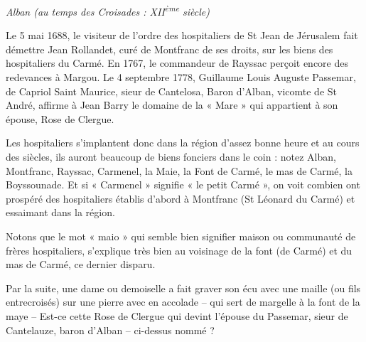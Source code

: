 \begin{center}
  {\Large\itshape Alban (au temps des Croisades : XII\textsuperscript{ème} siècle)}
\end{center}

\vspace{1em}

Le 5 mai 1688, le visiteur de l'ordre des hospitaliers de St Jean de Jérusalem fait démettre Jean Rollandet, curé de Montfranc de ses droits, sur les biens des hospitaliers du Carmé. En 1767, le commandeur de Rayssac perçoit encore des redevances à Margou. Le 4 septembre 1778, Guillaume Louis Auguste Passemar, de Capriol Saint Maurice, sieur de Cantelosa, Baron d'Alban, vicomte de St André, affirme à Jean Barry le domaine de la « Mare » qui appartient à son épouse, Rose de Clergue.

Les hospitaliers s'implantent donc dans la région d'assez bonne heure et au cours des siècles, ils auront beaucoup de biens fonciers dans le coin : notez Alban, Montfranc, Rayssac, Carmenel, la Maie, la Font de Carmé, le mas de Carmé, la Boyssounade. Et si « Carmenel » signifie « le petit Carmé », on voit combien ont prospéré des hospitaliers établis d'abord à Montfranc (St Léonard du Carmé) et essaimant dans la région.

Notons que le mot « maio » qui semble bien signifier maison ou communauté de frères hospitaliers, s'explique très bien au voisinage de la font (de Carmé) et du mas de Carmé, ce dernier disparu.

Par la suite, une dame ou demoiselle a fait graver son écu avec une maille (ou fils entrecroisés) sur une pierre avec en accolade -- qui sert de margelle à la font de la maye -- Est-ce cette Rose de Clergue qui devint l'épouse du Passemar, sieur de Cantelauze, baron d'Alban -- ci-dessus nommé ?

